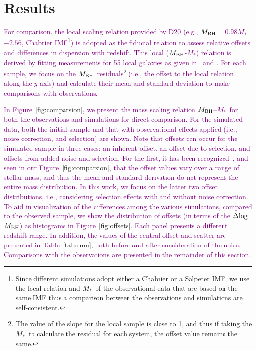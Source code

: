 \documentclass[twocolumn]{aastex631}
\newcommand{\todo}[1]{\textcolor{red}{[{\bf TODO}: #1]}}
\newcommand{\red}[1]{\textcolor{purple}{#1}}
\def\smass{{$M_*$}}
\def\mbh{$M_{\rm BH}$}
\begin{document}
\section{Results} \label{sec:result}
\red{For comparison, the local scaling relation provided by  D20 (e.g., \mbh$=0.98$\smass$-2.56$, Chabrier IMF\footnote{Since different simulations adopt either a Chabrier or a Salpeter IMF, we use the local relation and \smass\ of the observational data that are based on the same IMF thus a comparison between the observations and simulations are self-consistent.}) is adopted as the fiducial relation to assess relative offsets and differences in dispersion with redshift. This local (\mbh-\smass) relation is derived by fitting measurements for 55 local galaxies as given in~\citet{Bennert++2011} and \citet{H+R04}.}
\red{For each sample, we focus on the \mbh\ residuals\footnote{The value of the slope for the local sample is close to 1, and thus if taking the \smass\ to calculate the residual for each system, the offset value remains the same.} (i.e., the offset to the local relation along the $y$-axis) and calculate their mean and standard deviation to make comparisons with observations.}

\red{In Figure~\ref{fig:comparsion}, we present the mass scaling relation \mbh--\smass\ for both the observations and simulations for direct comparison. For the simulated data, both the initial sample and that with observational effects applied (i.e., noise correction, and selection) are shown. Note that offsets can occur for the simulated sample in three cases: an inherent offset, an offset due to selection, and offsets from added noise and selection. For the first, it has been recognized~\citep[e.g.,][Figure 2]{Habouzit2021}, and seen in our Figure~\ref{fig:comparsion}, that the  offset values vary over a range of stellar mass, and thus the mean and standard derivation do not represent the entire mass distribution.}
\red{In this work, we focus on the latter two offset distributions, i.e., considering selection effects with and without noise correction. To aid in visualization of the differences among the various simulations, compared to the observed sample, we show the distribution of offsets (in terms of the $\Delta{\rm log}$\mbh) as histograms in Figure~\ref{fig:offsets}.  Each panel presents a different redshift range. In addition, the values of the central offset and scatter are presented 
in Table~\ref{tab:sum}, both before and after consideration of the noise. Comparisons with the observations are presented in the remainder of this section.}
\end{document}

